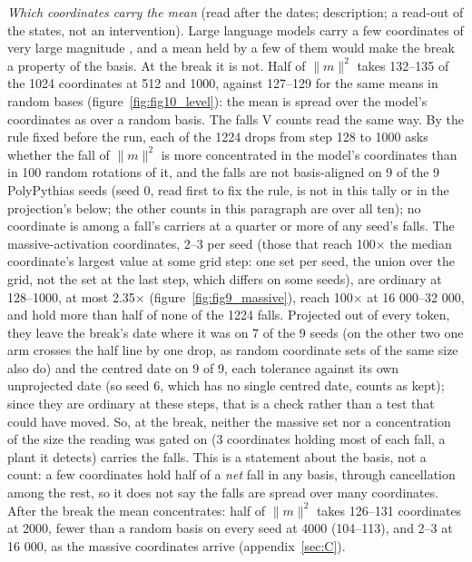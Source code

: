 \documentclass[11pt]{article}
\begin{document}
\emph{Which coordinates carry the mean} (read after the dates; description; a read-out of the states, not an intervention). Large language models carry a few coordinates of very large magnitude \citep{sun2024}, and a mean held by a few of them would make the break a property of the basis. At the break it is not. Half of $\|m\|^{2}$ takes 132--135 of the 1024 coordinates at 512 and 1000, against 127--129 for the same means in random bases (figure~\ref{fig:fig10_level}): the mean is spread over the model's coordinates as over a random basis. The falls V counts read the same way. By the rule fixed before the run, each of the 1224 drops from step 128 to 1000 asks whether the fall of $\|m\|^{2}$ is more concentrated in the model's coordinates than in 100 random rotations of it, and the falls are not basis-aligned on 9 of the 9 PolyPythias seeds (seed 0, read first to fix the rule, is not in this tally or in the projection's below; the other counts in this paragraph are over all ten); no coordinate is among a fall's carriers at a quarter or more of any seed's falls. The massive-activation coordinates, 2--3 per seed (those that reach 100$\times $ the median coordinate's largest value at some grid step: one set per seed, the union over the grid, not the set at the last step, which differs on some seeds), are ordinary at 128--1000, at most 2.35$\times $ (figure~\ref{fig:fig9_massive}), reach 100$\times $ at 16 000--32 000, and hold more than half of none of the 1224 falls. Projected out of every token, they leave the break's date where it was on 7 of the 9 seeds (on the other two one arm crosses the half line by one drop, as random coordinate sets of the same size also do) and the centred date on 9 of 9, each tolerance against its own unprojected date (so seed 6, which has no single centred date, counts as kept); since they are ordinary at these steps, that is a check rather than a test that could have moved. So, at the break, neither the massive set nor a concentration of the size the reading was gated on (3 coordinates holding most of each fall, a plant it detects) carries the falls. This is a statement about the basis, not a count: a few coordinates hold half of a \emph{net} fall in any basis, through cancellation among the rest, so it does not say the falls are spread over many coordinates. After the break the mean concentrates: half of $\|m\|^{2}$ takes 126--131 coordinates at 2000, fewer than a random basis on every seed at 4000 (104--113), and 2--3 at 16 000, as the massive coordinates arrive (appendix~\ref{sec:C}).
\end{document}
